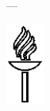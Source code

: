 \thispagestyle{empty}
\begin{center}

\vspace*{6.5cm}

\myName

\vspace{0.5cm}

\textbf{\Large \MakeTextUppercase{\myTitle}}

---

\large \MakeTextUppercase{\mySubtitle}

\vspace{9cm}

\includegraphics[height=2.7cm]{gfx/logo}


\normalsize
\MakeTextUppercase{\myUni}\\
\footnotesize
\MakeTextUppercase{\myFaculty}\\
\MakeTextUppercase{\myDepartment}\\
\myTime

\end{center}